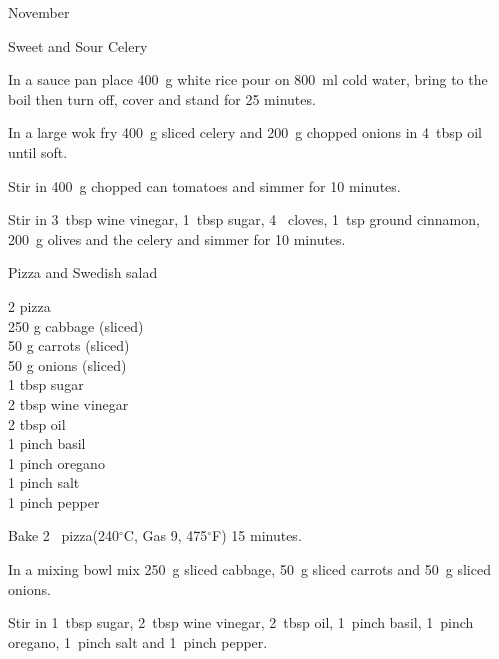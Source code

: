 \begin{menu}{November}
\begin{recipe}{2}{Sweet and Sour Celery}
\begin{ingredients}
		\end{ingredients}
	
    \begin{instructions}
    \item 
      In a
      sauce pan
      place
      400~g  white rice
      pour on
      800~ml  cold water,
      bring to the boil then turn off, cover and stand for 25 minutes.
    \item 
        In a large wok fry
        400~g sliced celery
        and
        200~g chopped onions
        in
        4~tbsp  oil
        until soft.
      \item 
        Stir in
        400~g chopped can tomatoes
        and simmer for 10 minutes.
      \item 
        Stir in
        3~tbsp  wine vinegar,
        1~tbsp  sugar,
        4~  cloves,
        1~tsp  ground cinnamon,
        200~g  olives
        and the celery
        and simmer for 10 minutes.
      
    \end{instructions}
    \end{recipe}%
  
    \begin{recipe}{1}{Pizza and Swedish salad}%
		\begin{ingredients}
		2  pizza  \\
	250 g cabbage (sliced) \\
	50 g carrots (sliced) \\
	50 g onions (sliced) \\
	1 tbsp sugar  \\
	2 tbsp wine vinegar  \\
	2 tbsp oil  \\
	1 pinch basil  \\
	1 pinch oregano  \\
	1 pinch salt  \\
	1 pinch pepper  \\
	
		\end{ingredients}
	
	
    \begin{instructions}
    \item 
        Bake 2~  pizza(240$^{\circ}$C, Gas 9, 475$^{\circ}$F) 15 minutes.
      \item 
        In a mixing bowl mix
        250~g sliced cabbage,
        50~g sliced carrots
        and
        50~g sliced onions.
      \item 
        Stir in
        1~tbsp  sugar,
        2~tbsp  wine vinegar,
        2~tbsp  oil,
        1~pinch  basil,
        1~pinch  oregano,
        1~pinch  salt
        and
        1~pinch  pepper.
      

\end{instructions}
\end{recipe}
\end{menu}
